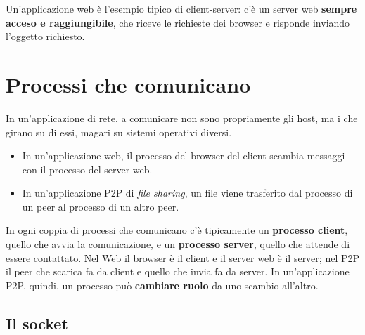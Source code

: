 Un'applicazione web è l'esempio tipico di client-server: c'è un server web
\textbf{sempre acceso e raggiungibile}, che riceve le richieste dei browser e
risponde inviando l'oggetto richiesto.

\section{Processi che comunicano}

In un'applicazione di rete, a comunicare non sono propriamente gli host, ma i
 che girano su di essi, magari su sistemi operativi diversi.

\begin{itemize}
  \item In un'applicazione web, il processo del browser del client scambia
        messaggi con il processo del server web.
  \item In un'applicazione P2P di \textit{file sharing}, un file viene trasferito
        dal processo di un peer al processo di un altro peer.
\end{itemize}

In ogni coppia di processi che comunicano c'è tipicamente un \textbf{processo
client}, quello che avvia la comunicazione, e un \textbf{processo server},
quello che attende di essere contattato. Nel Web il browser è il client e il
server web è il server; nel P2P il peer che scarica fa da client e quello che
invia fa da server. In un'applicazione P2P, quindi, un processo può
\textbf{cambiare ruolo} da uno scambio all'altro.

\subsection{Il socket}


